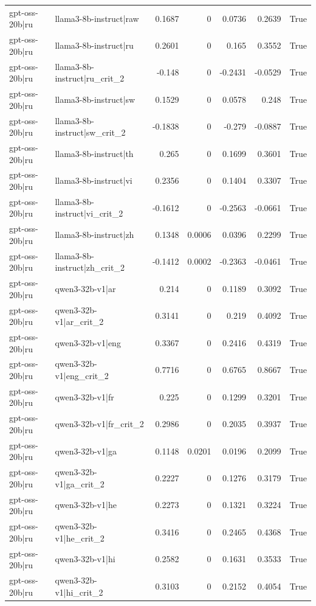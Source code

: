 \begin{table}
\begin{tabular}{l l r r r r l}
gpt-oss-20b|ru & llama3-8b-instruct|raw & 0.1687 & 0 & 0.0736 & 0.2639 & True \\
gpt-oss-20b|ru & llama3-8b-instruct|ru & 0.2601 & 0 & 0.165 & 0.3552 & True \\
gpt-oss-20b|ru & llama3-8b-instruct|ru_crit_2 & -0.148 & 0 & -0.2431 & -0.0529 & True \\
gpt-oss-20b|ru & llama3-8b-instruct|sw & 0.1529 & 0 & 0.0578 & 0.248 & True \\
gpt-oss-20b|ru & llama3-8b-instruct|sw_crit_2 & -0.1838 & 0 & -0.279 & -0.0887 & True \\
gpt-oss-20b|ru & llama3-8b-instruct|th & 0.265 & 0 & 0.1699 & 0.3601 & True \\
gpt-oss-20b|ru & llama3-8b-instruct|vi & 0.2356 & 0 & 0.1404 & 0.3307 & True \\
gpt-oss-20b|ru & llama3-8b-instruct|vi_crit_2 & -0.1612 & 0 & -0.2563 & -0.0661 & True \\
gpt-oss-20b|ru & llama3-8b-instruct|zh & 0.1348 & 0.0006 & 0.0396 & 0.2299 & True \\
gpt-oss-20b|ru & llama3-8b-instruct|zh_crit_2 & -0.1412 & 0.0002 & -0.2363 & -0.0461 & True \\
gpt-oss-20b|ru & qwen3-32b-v1|ar & 0.214 & 0 & 0.1189 & 0.3092 & True \\
gpt-oss-20b|ru & qwen3-32b-v1|ar_crit_2 & 0.3141 & 0 & 0.219 & 0.4092 & True \\
gpt-oss-20b|ru & qwen3-32b-v1|eng & 0.3367 & 0 & 0.2416 & 0.4319 & True \\
gpt-oss-20b|ru & qwen3-32b-v1|eng_crit_2 & 0.7716 & 0 & 0.6765 & 0.8667 & True \\
gpt-oss-20b|ru & qwen3-32b-v1|fr & 0.225 & 0 & 0.1299 & 0.3201 & True \\
gpt-oss-20b|ru & qwen3-32b-v1|fr_crit_2 & 0.2986 & 0 & 0.2035 & 0.3937 & True \\
gpt-oss-20b|ru & qwen3-32b-v1|ga & 0.1148 & 0.0201 & 0.0196 & 0.2099 & True \\
gpt-oss-20b|ru & qwen3-32b-v1|ga_crit_2 & 0.2227 & 0 & 0.1276 & 0.3179 & True \\
gpt-oss-20b|ru & qwen3-32b-v1|he & 0.2273 & 0 & 0.1321 & 0.3224 & True \\
gpt-oss-20b|ru & qwen3-32b-v1|he_crit_2 & 0.3416 & 0 & 0.2465 & 0.4368 & True \\
gpt-oss-20b|ru & qwen3-32b-v1|hi & 0.2582 & 0 & 0.1631 & 0.3533 & True \\
gpt-oss-20b|ru & qwen3-32b-v1|hi_crit_2 & 0.3103 & 0 & 0.2152 & 0.4054 & True \\

\end{tabular}
\end{table}
